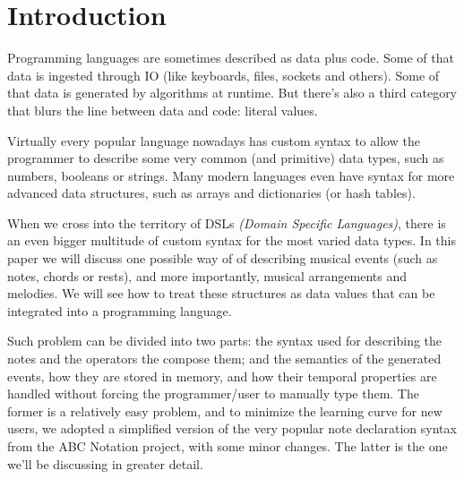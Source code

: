 \documentclass[a4paper,UKenglish,cleveref, autoref]{oasics-v2019}
\title{\ourtitle}
\author{Pedro M. Silva}{Dummy University Computing Laboratory, Portugal \and My second affiliation, Country \and \url{http://www.myhomepage.edu} }{johnqpublic@dummyuni.org}{https://orcid.org/0000-0002-1825-0097}{(Optional) author-specific funding acknowledgements}
\author{José João Almeida}%
       {Algoritmi, Departamento de Informática, Universidade do Minho, Braga, Portugal}%
       {jj@di.uminho.pt}%
       {https://orcid.org/0000-0002-0722-2031}
       {}
\begin{document}
\maketitle

\begin{abstract}
  In this paper, we'll discuss a simple approach to integrating musical events, such as notes or chords, into a programming language. First we'll analyze the problem and its particular requirements. Then we will discuss the solution we developed to meet those requirements. Finally we'll analyze the result and discuss possible alternative routes we could've taken.
\end{abstract}



\section{Introduction}
Programming languages are sometimes described as data plus code. Some of that data is ingested through IO (like keyboards, files, sockets and others). Some of that data is generated by algorithms at runtime. But there's also a third category that blurs the line between data and code: literal values.

Virtually every popular language nowadays has custom syntax to allow the programmer to describe some very common (and primitive) data types, such as numbers, booleans or strings. Many modern languages even have syntax for more advanced data structures, such as arrays and dictionaries (or hash tables).

When we cross into the territory of DSLs \textit{(Domain Specific Languages)}, there is an even bigger multitude of custom syntax for the most varied data types. In this paper we will discuss one possible way of of describing musical events (such as notes, chords or rests), and more importantly, musical arrangements and melodies. We will see how to treat these structures as data values that can be integrated into a programming language.

Such problem can be divided into two parts: the syntax used for describing the notes and the operators the compose them; and the semantics of the generated events, how they are stored in memory, and how their temporal properties are handled without forcing the programmer/user to manually type them. The former is a relatively easy problem, and to minimize the learning curve for new users, we adopted a simplified version of the very popular note declaration syntax from the ABC Notation project\cite{AbcNotation}, with some minor changes. The latter is the one we'll be discussing in greater detail.
\end{document}
